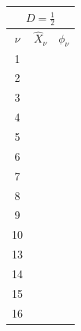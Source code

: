 \documentclass[a4paper, 12pt]{article}
\begin{document}
  \vspace{0.021276873\paperheight}
  \begin{table}[H]
    \begin{center}
      \begin{tabular}{@{}ccc@{}}
      \toprule
      \multicolumn{3}{c}{$D = \frac{1}{2}$} \\ \midrule
      $\nu$      & $\hat{X}_\nu$   & $\phi_\nu$    \\ \hline
      1          &           &              \\
      2          &           &              \\
      3          &           &              \\
      4          &           &              \\
      5          &           &              \\
      6          &           &              \\
      7          &           &              \\
      8          &           &              \\
      9          &           &              \\
      10         &           &              \\
      13         &           &              \\
      14         &           &              \\
      15         &           &              \\
      16         &           &              \\ \bottomrule
      \end{tabular}
    \end{center}
  \end{table}

  \begin{gather*}
  \end{gather*}
\end{document}
